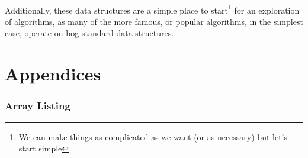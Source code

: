 \documentclass[10pt, a4paper, twosize]{article}
\begin{document}
\paragraph{} Additionally, these data structures are a simple place to start\footnote{We can make things as complicated as we want (or as necessary) but let's start simple} for an exploration of algorithms, as many of the more famous, or popular algorithms, in the simplest case, operate on bog standard data-structures.



\part{Appendices}

\appendix

\section{Array Listing}
\label{array_listing}
\end{document}
